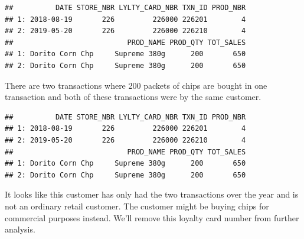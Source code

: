 \documentclass[
]{article}
\newenvironment{Shaded}{\begin{snugshade}}{\end{snugshade}}
\newcommand{\CommentTok}[1]{\textcolor[rgb]{0.56,0.35,0.01}{\textit{#1}}}
\newcommand{\DecValTok}[1]{\textcolor[rgb]{0.00,0.00,0.81}{#1}}
\newcommand{\DocumentationTok}[1]{\textcolor[rgb]{0.56,0.35,0.01}{\textbf{\textit{#1}}}}
\newcommand{\FunctionTok}[1]{\textcolor[rgb]{0.13,0.29,0.53}{\textbf{#1}}}
\newcommand{\NormalTok}[1]{#1}
\newcommand{\OtherTok}[1]{\textcolor[rgb]{0.56,0.35,0.01}{#1}}
\newcommand{\SpecialCharTok}[1]{\textcolor[rgb]{0.81,0.36,0.00}{\textbf{#1}}}
\begin{document}
\begin{verbatim}
##          DATE STORE_NBR LYLTY_CARD_NBR TXN_ID PROD_NBR
## 1: 2018-08-19       226         226000 226201        4
## 2: 2019-05-20       226         226000 226210        4
##                           PROD_NAME PROD_QTY TOT_SALES
## 1: Dorito Corn Chp     Supreme 380g      200       650
## 2: Dorito Corn Chp     Supreme 380g      200       650
\end{verbatim}

There are two transactions where 200 packets of chips are bought in one
transaction and both of these transactions were by the same customer.

\begin{Shaded}
\end{Shaded}

\begin{verbatim}
##          DATE STORE_NBR LYLTY_CARD_NBR TXN_ID PROD_NBR
## 1: 2018-08-19       226         226000 226201        4
## 2: 2019-05-20       226         226000 226210        4
##                           PROD_NAME PROD_QTY TOT_SALES
## 1: Dorito Corn Chp     Supreme 380g      200       650
## 2: Dorito Corn Chp     Supreme 380g      200       650
\end{verbatim}

It looks like this customer has only had the two transactions over the
year and is not an ordinary retail customer. The customer might be
buying chips for commercial purposes instead. We'll remove this loyalty
card number from further analysis.

\begin{Shaded}
\end{Shaded}
\end{document}
